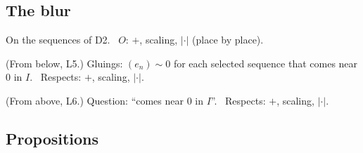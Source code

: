 \subsection*{The blur}

On the sequences of D2. \ $O$: $+$, scaling, $|\cdot|$ (place by place).

\begin{lines}
\item[\lab{B1}] (From below, L5.) Gluings: $(e_n) \sim 0$ for each selected sequence that comes near $0$ in $I$. \ Respects: $+$, scaling, $|\cdot|$.
\item[\lab{B2}] (From above, L6.) Question: ``comes near $0$ in $I$''. \ Respects: $+$, scaling, $|\cdot|$.
\end{lines}

\subsection*{Propositions}

